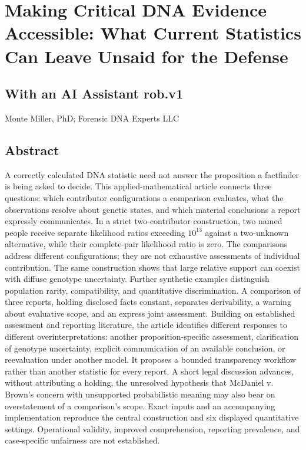 \documentclass[
]{article}
\author{}
\date{}
\begin{document}
\section{Making Critical DNA Evidence Accessible: What Current
Statistics Can Leave Unsaid for the
Defense}\label{making-critical-dna-evidence-accessible-what-current-statistics-can-leave-unsaid-for-the-defense}

\subsection{With an AI Assistant
rob.v1}\label{with-an-ai-assistant-rob.v1}

Monte Miller, PhD; Forensic DNA Experts LLC

\subsection{Abstract}\label{abstract}

A correctly calculated DNA statistic need not answer the proposition a
factfinder is being asked to decide. This applied-mathematical article
connects three questions: which contributor configurations a comparison
evaluates, what the observations resolve about genetic states, and which
material conclusions a report expressly communicates. In a strict
two-contributor construction, two named people receive separate
likelihood ratios exceeding \(10^{13}\) against a two-unknown
alternative, while their complete-pair likelihood ratio is zero. The
comparisons address different configurations; they are not exhaustive
assessments of individual contribution. The same construction shows that
large relative support can coexist with diffuse genotype uncertainty.
Further synthetic examples distinguish population rarity, compatibility,
and quantitative discrimination. A comparison of three reports, holding
disclosed facts constant, separates derivability, a warning about
evaluative scope, and an express joint assessment. Building on
established assessment and reporting literature, the article identifies
different responses to different overinterpretations: another
proposition-specific assessment, clarification of genotype uncertainty,
explicit communication of an available conclusion, or reevaluation under
another model. It proposes a bounded transparency workflow rather than
another statistic for every report. A short legal discussion advances,
without attributing a holding, the unresolved hypothesis that McDaniel
v. Brown's concern with unsupported probabilistic meaning may also bear
on overstatement of a comparison's scope. Exact inputs and an
accompanying implementation reproduce the central construction and six
displayed quantitative settings. Operational validity, improved
comprehension, reporting prevalence, and case-specific unfairness are
not established.
\end{document}

